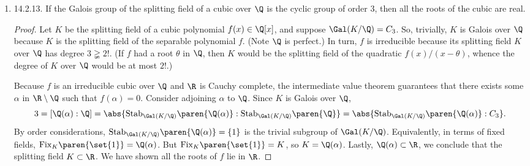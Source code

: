 \documentclass[onesided]{ccg-pset}
\renewcommand{\Stab}[2]{\mathrm{Stab}_{#1}\paren{#2}}
\newcommand{\Fix}[2]{\mathrm{Fix}_{#1}\paren{#2}}
\begin{document}
\begin{enumerate}
\begin{claim*}[]
    Any Galois extensions of $\Q$ of degree $4$ has no proper subfields.
\end{claim*}

\begin{proof}
    Let $K/\Q$ be a degree $4$ extension of $\Q$. If $K/\Q$ is Galois, then $\Gal(K/\Q)$ is group of order $4$, so either the \emph{Viergruppe} $V_4$ or the cyclic group $C_4$. In either case, both $V_4$ and $C_4$ are abelian and contain some subgroup of index~$2$. Let $H$ be such a subgroup. Then the fixed field $\Fix K H$ has relative dimension $2$ over $\Q$. Therefore $K$ contains a proper subfield.
\end{proof}


\item \label{14.2.13} 14.2.13.
If the Galois group of the splitting field of a cubic over $\Q$ is the cyclic group of order $3$, then all the roots of the cubic are real.

\newcommand{\gal}{\Gal(K/\Q)} 

\begin{proof}
Let $K$ be the splitting field of a cubic polynomial $f(x) \in \Q[x]$, and suppose $\gal = C_3$. So, trivially, $K$ is Galois over $\Q$ because $K$ is the splitting field of the separable polynomial $f$. 
(Note $\Q$ is perfect.)
In turn, $f$ is irreducible because its splitting field $K$ over $\Q$ has degree $3 \gneqq 2!$. 
(If $f$ had a root $\theta$ in $\Q$, then $K$ would be the splitting field of the quadratic $f(x)/(x-\theta)$, whence the degree of $K$ over $\Q$ would be at most $2!$.)

Because $f$ is an irreducible cubic over $\Q$ and $\R$ is Cauchy complete, the intermediate value theorem guarantees that there exists some $\alpha$ in $\R \setminus \Q$ such that $f(\alpha) = 0$.
Consider adjoining $\alpha$ to $\Q$. 
Since $K$ is Galois over $\Q$, 
\begin{equation*}
    3 = [\Q(\alpha):\Q] = \abs{ \Stab {\gal} {\Q(\alpha)} :\Stab {\gal}{\Q} } = \abs{ \Stab {\gal} {\Q(\alpha)}: C_3}.
\end{equation*}
By order considerations, $\Stab {\gal} {\Q(\alpha)} = \{1\}$ is the trivial subgroup of $\gal$. 
Equivalently, in terms of fixed fields, $\Fix {K}{\set{1} } = \Q(\alpha)$. 
But $\Fix K { \set{1} } = K$, so $K = \Q(\alpha)$. 
Lastly, $\Q(\alpha) \subset \R$, we conclude that the splitting field $K \subset \R$. 
We have shown all the roots of $f$ lie in $\R$.
\end{proof}


\end{enumerate}
\end{document}
